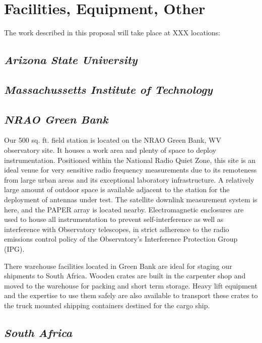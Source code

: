 \documentclass[11pt]{article}
\begin{document}
\pagestyle{empty}

\section*{Facilities, Equipment, Other}

The work described in this proposal will take place at XXX locations: 

\subsection{\it Arizona State University}

\subsection{\it Massachussetts Institute of Technology}

\subsection*{\it NRAO Green Bank} 


Our 500 sq. ft. field station is located on the NRAO Green Bank, WV observatory
site. It houses a work area and plenty of space to deploy instrumentation.
Positioned within the National Radio Quiet Zone, this site is an ideal venue
for very sensitive radio frequency measurements due to its remoteness from
large urban areas and its exceptional laboratory infrastructure. A relatively
large amount of outdoor space is available adjacent to the station for the
deployment of antennas under test. The satellite downlink measurement system is
here, and the PAPER array is located nearby. Electromagnetic enclosures are
used to house all instrumentation to prevent self-interference as well as
interference with Observatory telescopes, in strict adherence to the radio
emissions control policy of the Observatory’s Interference Protection Group
(IPG).

There warehouse facilities located in Green Bank are ideal for staging our
shipments to South Africa. Wooden crates are built in the carpenter shop and
moved to the warehouse for packing and short term storage. Heavy lift
equipment and the expertise to use them safely are also available to transport
these crates to the truck mounted shipping containers destined for the cargo
ship.

\subsection*{\it South Africa}
\end{document}
